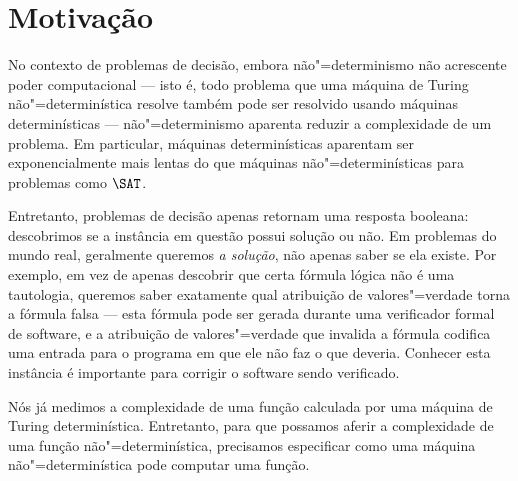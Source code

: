 \section{Motivação}

No contexto de problemas de decisão,
embora não"=determinismo não acrescente poder computacional
--- isto é,
todo problema que uma máquina de Turing não"=determinística resolve
também pode ser resolvido usando máquinas determinísticas
---
não"=determinismo aparenta reduzir a complexidade de um problema.
Em particular,
máquinas determinísticas aparentam ser exponencialmente mais lentas
do que máquinas não"=determinísticas
para problemas como $\SAT$.

Entretanto,
problemas de decisão apenas retornam uma resposta booleana:
descobrimos se a instância em questão possui solução ou não.
Em problemas do mundo real,
geralmente queremos \emph{a solução},
não apenas saber se ela existe.
Por exemplo,
em vez de apenas descobrir que certa fórmula lógica não é uma tautologia,
queremos saber exatamente qual atribuição de valores"=verdade
torna a fórmula falsa
--- esta fórmula pode ser gerada durante uma verificador formal de software,
e a atribuição de valores"=verdade que invalida a fórmula
codifica uma entrada para o programa
em que ele não faz o que deveria.
Conhecer esta instância é importante para corrigir o software sendo verificado.

Nós já medimos a complexidade de uma função
calculada por uma máquina de Turing determinística.
Entretanto,
para que possamos aferir a complexidade de uma função não"=determinística,
precisamos especificar como uma máquina não"=determinística pode computar uma função.
